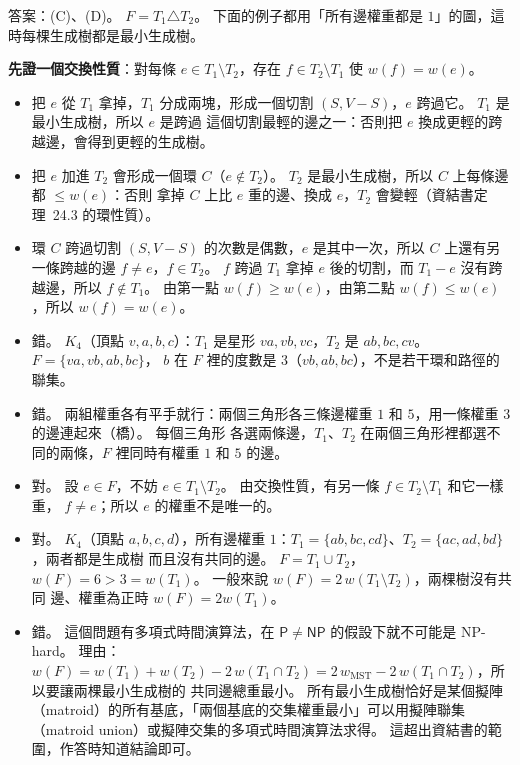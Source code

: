 \begin{pastsoln}
答案：(C)、(D)。 $F = T_1 \triangle T_2$。 下面的例子都用「所有邊權重都是 $1$」的圖，這時每棵生成樹都是最小生成樹。

\textbf{先證一個交換性質}：對每條 $e \in T_1 \setminus T_2$，存在 $f \in T_2 \setminus T_1$ 使 $w(f) = w(e)$。
\begin{itemize}
\item 把 $e$ 從 $T_1$ 拿掉，$T_1$ 分成兩塊，形成一個切割 $(S, V - S)$，$e$ 跨過它。 $T_1$ 是最小生成樹，所以 $e$ 是跨過
這個切割最輕的邊之一：否則把 $e$ 換成更輕的跨越邊，會得到更輕的生成樹。
\item 把 $e$ 加進 $T_2$ 會形成一個環 $C$（$e \notin T_2$）。 $T_2$ 是最小生成樹，所以 $C$ 上每條邊都 $\le w(e)$：否則
拿掉 $C$ 上比 $e$ 重的邊、換成 $e$，$T_2$ 會變輕（資結書定理~24.3 的環性質）。
\item 環 $C$ 跨過切割 $(S, V - S)$ 的次數是偶數，$e$ 是其中一次，所以 $C$ 上還有另一條跨越的邊 $f \ne e$，$f \in T_2$。
$f$ 跨過 $T_1$ 拿掉 $e$ 後的切割，而 $T_1 - e$ 沒有跨越邊，所以 $f \notin T_1$。 由第一點 $w(f) \ge w(e)$，由第二點
$w(f) \le w(e)$，所以 $w(f) = w(e)$。
\end{itemize}

\begin{itemize}
\item[(A)] 錯。 $K_4$（頂點 $v, a, b, c$）：$T_1$ 是星形 $va, vb, vc$，$T_2$ 是 $ab, bc, cv$。 $F = \{va, vb, ab, bc\}$，
$b$ 在 $F$ 裡的度數是 $3$（$vb, ab, bc$），不是若干環和路徑的聯集。
\item[(B)] 錯。 兩組權重各有平手就行：兩個三角形各三條邊權重 $1$ 和 $5$，用一條權重 $3$ 的邊連起來（橋）。 每個三角形
各選兩條邊，$T_1$、$T_2$ 在兩個三角形裡都選不同的兩條，$F$ 裡同時有權重 $1$ 和 $5$ 的邊。
\item[(C)] 對。 設 $e \in F$，不妨 $e \in T_1 \setminus T_2$。 由交換性質，有另一條 $f \in T_2 \setminus T_1$ 和它一樣重，
$f \ne e$；所以 $e$ 的權重不是唯一的。
\item[(D)] 對。 $K_4$（頂點 $a, b, c, d$），所有邊權重 $1$：$T_1 = \{ab, bc, cd\}$、$T_2 = \{ac, ad, bd\}$，兩者都是生成樹
而且沒有共同的邊。 $F = T_1 \cup T_2$，$w(F) = 6 > 3 = w(T_1)$。 一般來說 $w(F) = 2\,w(T_1 \setminus T_2)$，兩棵樹沒有共同
邊、權重為正時 $w(F) = 2 w(T_1)$。
\item[(E)] 錯。 這個問題有多項式時間演算法，在 $\mathsf{P} \ne \mathsf{NP}$ 的假設下就不可能是 NP-hard。 理由：
$w(F) = w(T_1) + w(T_2) - 2\,w(T_1 \cap T_2) = 2\,w_{\mathrm{MST}} - 2\,w(T_1 \cap T_2)$，所以要讓兩棵最小生成樹的
共同邊總重最小。 所有最小生成樹恰好是某個擬陣（matroid）的所有基底，「兩個基底的交集權重最小」可以用擬陣聯集
（matroid union）或擬陣交集的多項式時間演算法求得。 這超出資結書的範圍，作答時知道結論即可。
\end{itemize}
\end{pastsoln}
